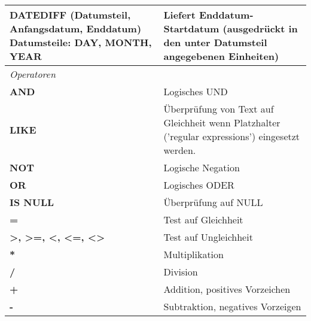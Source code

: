 \begin{center}
\begin{tabular}{|p{} | p{}|}
		\hline
		\textbf{DATEDIFF} (Datumsteil, Anfangsdatum, Enddatum) Datumsteile: \textbf{DAY, MONTH, YEAR} & Liefert Enddatum-Startdatum (ausgedrückt in den unter Datumsteil angegebenen Einheiten)\\
		\hline
		\rowcolor{tableLightGray} \textit{Operatoren} & \\
		\hline
		\textbf{AND} & Logisches UND\\
		\hline
		\textbf{LIKE} & Überprüfung von Text auf Gleichheit wenn Platzhalter ('regular expressions') eingesetzt werden.\\
		\hline
		\textbf{NOT} & Logische Negation\\
		\hline
		\textbf{OR} & Logisches ODER\\
		\hline
		\textbf{IS NULL} & Überprüfung auf NULL\\
		\hline
		\textbf{=} & Test auf Gleichheit\\
		\hline
		\textbf{>, >=, <, <=, <>} & Test auf Ungleichheit\\
		\hline
		\textbf{*} & Multiplikation\\
		\hline
		\textbf{/} & Division\\
		\hline
		\textbf{+} & Addition, positives Vorzeichen\\
		\hline
		\textbf{-} & Subtraktion, negatives Vorzeigen\\
		\hline
	\end{tabular}
\end{center}